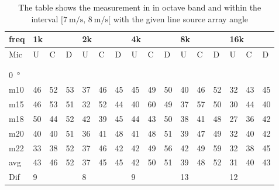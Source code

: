 \begin{table}[H]
\centering
\caption{The table shows the measurement in in octave band and within the interval $[\SI{7}{\meter\per\second},\, \SI{8}{\meter\per\second}[ $ with the given line source array angle}
\begin{tabular}{l|l|l|l|l|l|l|l|l|l|l|l|l|lll}
freq & \multicolumn{3}{l|}{1k} & \multicolumn{3}{l|}{2k} & \multicolumn{3}{l|}{4k} & \multicolumn{3}{l|}{8k} & \multicolumn{3}{l}{16k}                                \\ \hline
Mic  & U      & C      & D     & U      & C      & D     & U      & C      & D     & U      & C      & D     & \multicolumn{1}{l|}{U}  & \multicolumn{1}{l|}{C}  & D  \\ \hline
 & \multicolumn{3}{l|}{} & \multicolumn{3}{l|}{} & \multicolumn{3}{l|}{} & \multicolumn{3}{l|}{} & \multicolumn{3}{l}{}                                \\ 
 \multicolumn{16}{l}{ } \\   
\SI{0}{\degree}   & \multicolumn{3}{l|}{} & \multicolumn{3}{l|}{} & \multicolumn{3}{l|}{} & \multicolumn{3}{l|}{} & \multicolumn{3}{l}{}   \\  \hline
m10  & 46     & 52     & 53    & 37     & 46     & 45    & 45     & 49     & 50    & 40     & 46     & 52    & \multicolumn{1}{l|}{32} & \multicolumn{1}{l|}{43} & 45 \\
m15  & 46     & 53     & 51    & 32     & 52     & 44    & 40     & 60     & 49    & 37     & 57     & 50    & \multicolumn{1}{l|}{30} & \multicolumn{1}{l|}{44} & 40 \\
m18  & 50     & 44     & 52    & 42     & 39     & 45    & 44     & 43     & 50    & 38     & 41     & 48    & \multicolumn{1}{l|}{27} & \multicolumn{1}{l|}{36} & 42 \\
m20  & 40     & 40     & 51    & 36     & 41     & 48    & 41     & 48     & 51    & 39     & 47     & 49    & \multicolumn{1}{l|}{32} & \multicolumn{1}{l|}{40} & 42 \\
m22  & 33     & 38     & 52    & 37     & 46     & 42    & 42     & 49     & 56    & 42     & 49     & 59    & \multicolumn{1}{l|}{32} & \multicolumn{1}{l|}{38} & 45 \\ \hline
avg  &  43     &  46   &  52    &  37    & 45     & 45    &  42    &  50    &  51   &  39    &  48    & 52    & \multicolumn{1}{l|}{31}   & \multicolumn{1}{l|}{40}   &  43 \\ \hline  
Dif & \multicolumn{3}{l|}{9} & \multicolumn{3}{l|}{8} & \multicolumn{3}{l|}{9} & \multicolumn{3}{l|}{13} & \multicolumn{3}{l}{12}  \\ 

\end{tabular}
\end{table}
